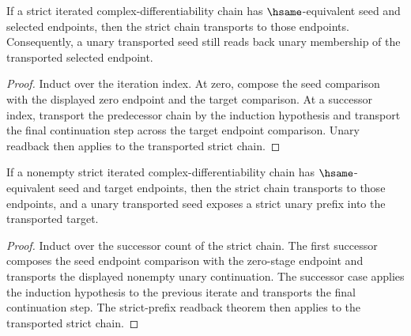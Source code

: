 \begin{theorem}
\label{thm:iterated-strict-cplx-diff-hsame-transport-unary-readback}
If a strict iterated complex-differentiability chain has $\hsame$-equivalent
seed and selected endpoints, then the strict chain transports to those
endpoints. Consequently, a unary transported seed still reads back unary
membership of the transported selected endpoint.
\end{theorem}
\begin{proof}
Induct over the iteration index. At zero, compose the seed comparison with
the displayed zero endpoint and the target comparison. At a successor index,
transport the predecessor chain by the induction hypothesis and transport the
final continuation step across the target endpoint comparison. Unary readback
then applies to the transported strict chain.
\end{proof}

\begin{theorem}
\label{thm:iterated-strict-cplx-diff-hsame-transport-strict-prefix}
If a nonempty strict iterated complex-differentiability chain has $\hsame$-equivalent seed and target endpoints, then the strict chain transports to those endpoints, and a unary transported seed exposes a strict unary prefix into the transported target.
\end{theorem}
\begin{proof}
Induct over the successor count of the strict chain. The first successor composes the seed endpoint comparison with the zero-stage endpoint and transports the displayed nonempty unary continuation. The successor case applies the induction hypothesis to the previous iterate and transports the final continuation step. The strict-prefix readback theorem then applies to the transported strict chain.
\end{proof}

